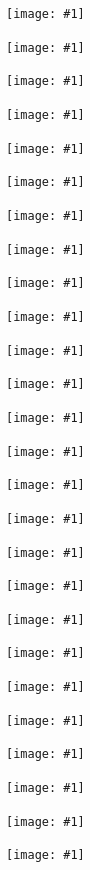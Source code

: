 \documentclass[a4paper]{article}
\newcommand*{\includeFullPage}[1]{ %
    \newpage%
    \vspace*{-2.5cm}%
    \hspace*{-0.16\textwidth}%
    \texttt{[image: \#1]}%
}
\begin{document}
    \centering

    \newpage
    \recalctypearea

    \includeFullPage{current.pdf}

    \includeFullPage{solution_rel.pdf}

        \includeFullPage{Overview/IP_solution_rel.pdf}

        \includeFullPage{Overview/DW_solution_rel.pdf}

        \includeFullPage{Overview/CSA_solution_rel.pdf}

        \includeFullPage{Overview/GAS_solution_rel.pdf}

        \includeFullPage{Overview/TA_solution_rel.pdf}

        \includeFullPage{Overview/PSE_solution_rel.pdf}

        \includeFullPage{Overview/CALC_solution_rel.pdf}

        \includeFullPage{Overview/CG_solution_rel.pdf}

        \includeFullPage{Overview/GP_solution_rel.pdf}

        \includeFullPage{Overview/MB_solution_rel.pdf}

        \includeFullPage{Overview/US_solution_rel.pdf}

        \includeFullPage{Overview/IDBS_solution_rel.pdf}

        \includeFullPage{Overview/LA_solution_rel.pdf}

        \includeFullPage{Overview/AC_solution_rel.pdf}

        \includeFullPage{Overview/PPD_solution_rel.pdf}

        \includeFullPage{Overview/CN_solution_rel.pdf}

        \includeFullPage{Overview/NA_solution_rel.pdf}

        \includeFullPage{Overview/ES_solution_rel.pdf}

        \includeFullPage{Overview/COMP_solution_rel.pdf}

        \includeFullPage{Overview/SE_solution_rel.pdf}

        \includeFullPage{Overview/TCS_solution_rel.pdf}

        \includeFullPage{Overview/DS_solution_rel.pdf}

        \includeFullPage{Overview/AI_solution_rel.pdf}

        \includeFullPage{Overview/DSGA_solution_rel.pdf}
\end{document}
